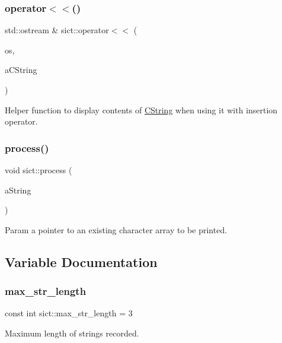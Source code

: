 \subsubsection{\texorpdfstring{operator$<$$<$()}{operator<<()}}
{\footnotesize\ttfamily std\+::ostream \& sict\+::operator$<$$<$ (\begin{DoxyParamCaption}\item[{std\+::ostream \&}]{os,  }\item[{const \mbox{\hyperlink{classsict_1_1CString}{C\+String}} \&}]{a\+C\+String }\end{DoxyParamCaption})}

Helper function to display contents of \mbox{\hyperlink{classsict_1_1CString}{C\+String}} when using it with insertion operator. \mbox{\label{namespacesict_acc63f5191bf3d6b1377757e4aadf289a}} 
\subsubsection{\texorpdfstring{process()}{process()}}
{\footnotesize\ttfamily void sict\+::process (\begin{DoxyParamCaption}\item[{const char $\ast$}]{a\+String }\end{DoxyParamCaption})}

Param a pointer to an existing character array to be printed. 

\subsection{Variable Documentation}
\mbox{\label{namespacesict_a42e52c18360f7ab5f80c8b39b7bf8b11}} 
\subsubsection{\texorpdfstring{max\+\_\+str\+\_\+length}{max\_str\_length}}
{\footnotesize\ttfamily const int sict\+::max\+\_\+str\+\_\+length = 3}

Maximum length of strings recorded. 